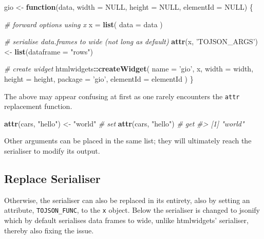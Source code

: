 \documentclass[10pt,]{krantz}
\makeatletter
\newenvironment{Shaded}{\begin{snugshade}}{\end{snugshade}}
\newcommand{\CommentTok}[1]{\textcolor[rgb]{0.37,0.37,0.37}{\textit{#1}}}
\newcommand{\ControlFlowTok}[1]{\textcolor[rgb]{0.27,0.27,0.27}{\textbf{#1}}}
\newcommand{\DataTypeTok}[1]{\textcolor[rgb]{0.27,0.27,0.27}{#1}}
\newcommand{\KeywordTok}[1]{\textcolor[rgb]{0.27,0.27,0.27}{\textbf{#1}}}
\newcommand{\NormalTok}[1]{#1}
\newcommand{\OperatorTok}[1]{\textcolor[rgb]{0.43,0.43,0.43}{\textbf{#1}}}
\newcommand{\OtherTok}[1]{\textcolor[rgb]{0.37,0.37,0.37}{#1}}
\newcommand{\StringTok}[1]{\textcolor[rgb]{0.5,0.5,0.5}{#1}}
\newenvironment{kframe}{%
\medskip{}
\setlength{\fboxsep}{.8em}
 \def\at@end@of@kframe{}%
 \ifinner\ifhmode%
  \def\at@end@of@kframe{\end{minipage}}%
  \begin{minipage}{\columnwidth}%
 \fi\fi%
 \def\FrameCommand##1{\hskip\@totalleftmargin \hskip-\fboxsep
 \colorbox{shadecolor}{##1}\hskip-\fboxsep
     \hskip-\linewidth \hskip-\@totalleftmargin \hskip\columnwidth}%
 \MakeFramed {\advance\hsize-\width
   \@totalleftmargin\z@ \linewidth\hsize
   \@setminipage}}%
 {\par\unskip\endMakeFramed%
 \at@end@of@kframe}
\renewenvironment{Shaded}{\begin{kframe}}{\end{kframe}}
\makeatother
\begin{document}
\begin{Shaded}
\begin{Highlighting}[]
\NormalTok{gio <-}\StringTok{ }\ControlFlowTok{function}\NormalTok{(data, }\DataTypeTok{width =} \OtherTok{NULL}\NormalTok{, }\DataTypeTok{height =} \OtherTok{NULL}\NormalTok{, }
  \DataTypeTok{elementId =} \OtherTok{NULL}\NormalTok{) \{}

  \CommentTok{# forward options using x}
\NormalTok{  x =}\StringTok{ }\KeywordTok{list}\NormalTok{(}
    \DataTypeTok{data =}\NormalTok{ data}
\NormalTok{  )}

  \CommentTok{# serialise data.frames to wide (not long as default)}
  \KeywordTok{attr}\NormalTok{(x, }\StringTok{'TOJSON_ARGS'}\NormalTok{) <-}\StringTok{ }\KeywordTok{list}\NormalTok{(}\DataTypeTok{dataframe =} \StringTok{"rows"}\NormalTok{)}

  \CommentTok{# create widget}
\NormalTok{  htmlwidgets}\OperatorTok{::}\KeywordTok{createWidget}\NormalTok{(}
    \DataTypeTok{name =} \StringTok{'gio'}\NormalTok{,}
\NormalTok{    x,}
    \DataTypeTok{width =}\NormalTok{ width,}
    \DataTypeTok{height =}\NormalTok{ height,}
    \DataTypeTok{package =} \StringTok{'gio'}\NormalTok{,}
    \DataTypeTok{elementId =}\NormalTok{ elementId}
\NormalTok{  )}
\NormalTok{\}}
\end{Highlighting}
\end{Shaded}

The above may appear confusing at first as one rarely encounters the \texttt{attr} replacement function.

\begin{Shaded}
\begin{Highlighting}[]
\KeywordTok{attr}\NormalTok{(cars, }\StringTok{"hello"}\NormalTok{) <-}\StringTok{ "world"} \CommentTok{# set }
\KeywordTok{attr}\NormalTok{(cars, }\StringTok{"hello"}\NormalTok{) }\CommentTok{# get }
\CommentTok{#> [1] "world"}
\end{Highlighting}
\end{Shaded}

Other arguments can be placed in the same list; they will ultimately reach the serialiser to modify its output.

\hypertarget{widgets-full-transform-data-replace}{%
\subsection{Replace Serialiser}\label{widgets-full-transform-data-replace}}

Otherwise, the serialiser can also be replaced in its entirety, also by setting an attribute, \texttt{TOJSON\_FUNC}, to the \texttt{x} object. Below the serialiser is changed to jsonify \citep{R-jsonify} which by default serialises data frames to wide, unlike htmlwidgets' serialiser, thereby also fixing the issue.
\end{document}
